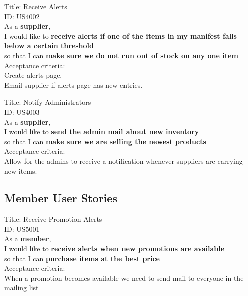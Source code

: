 \documentclass{article}
\begin{document}
\begin{framed}
\noindent
Title:  Receive Alerts \\
ID: US4002 \\
As a \textbf{supplier},\\
 \textbullet  \quad \quad I would like to \textbf{receive alerts if one of the items in my manifest falls below a certain threshold }\\ 
 \textbullet  \quad \quad so that I can \textbf{make sure we do not run out of stock on any one item}\\
 Acceptance criteria: \\
  \textbullet  \quad \quad Create alerts page.\\
  \textbullet  \quad \quad Email supplier if alerts page has new entries.
\end{framed}


\begin{framed}
\noindent
Title:  Notify Administrators \\
ID: US4003 \\
As a \textbf{supplier},\\
 \textbullet  \quad \quad I would like to \textbf{send the admin mail about new inventory }\\ 
 \textbullet  \quad \quad so that I can \textbf{make sure we are selling the newest products}\\
 Acceptance criteria: \\
  \textbullet  \quad \quad Allow for the admins to receive a notification whenever suppliers are carrying new items.
\end{framed}

\subsection{Member User Stories}

\begin{framed}
\noindent
Title:  Receive Promotion Alerts \\
ID: US5001 \\
As a \textbf{member},\\
 \textbullet  \quad \quad I would like to \textbf{receive alerts when new promotions are available }\\ 
 \textbullet  \quad \quad so that I can \textbf{purchase items at the best price}\\
 Acceptance criteria: \\
  \textbullet  \quad \quad When a promotion becomes available we need to send mail to everyone in the mailing list
\end{framed}
\end{document}
